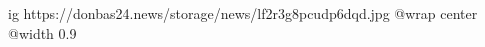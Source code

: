  
 
 
 
 

\ifcmt
  ig https://donbas24.news/storage/news/lf2r3g8pcudp6dqd.jpg
  @wrap center
  @width 0.9
\fi
